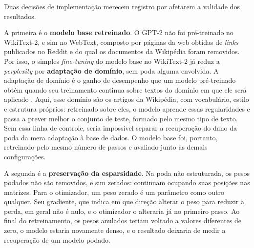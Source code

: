 Duas decisões de implementação merecem registro por afetarem a validade dos resultados.

A primeira é o \textbf{modelo base retreinado}. O GPT-2 não foi pré-treinado no WikiText-2, e sim
no WebText, composto por páginas da web obtidas de \textit{links} publicados no Reddit e do
qual os documentos da Wikipédia foram removidos.
Por isso, o simples \textit{fine-tuning} do modelo base no WikiText-2 já reduz a
\textit{perplexity} por \textbf{adaptação de domínio}, sem poda alguma envolvida. A
adaptação de domínio é o ganho de desempenho que um modelo pré-treinado obtém quando seu
treinamento continua sobre textos do domínio em que ele será aplicado
\cite{Gururangan2020}. Aqui, esse domínio são os artigos da Wikipédia, com vocabulário,
estilo e estrutura próprios: retreinado sobre eles, o modelo aprende essas regularidades e
passa a prever melhor o conjunto de teste, formado pelo mesmo tipo de texto. Sem essa linha
de controle, seria
impossível separar a recuperação do dano da poda da mera adaptação à base de dados. O modelo
base foi, portanto, retreinado pelo mesmo número de passos e avaliado junto às demais
configurações.

A segunda é a \textbf{preservação da esparsidade}. Na poda não estruturada, os pesos
podados não são removidos, e sim zerados: continuam ocupando suas posições nas matrizes.
Para o otimizador, um peso zerado é um parâmetro
como outro qualquer. Seu gradiente, que indica em que direção alterar o peso para reduzir a
perda, em geral não é nulo, e o otimizador o alteraria já no primeiro passo. Ao final do
retreinamento, os pesos anulados teriam voltado a valores diferentes de zero, o modelo
estaria novamente denso, e o resultado deixaria de medir a recuperação de um modelo podado.


